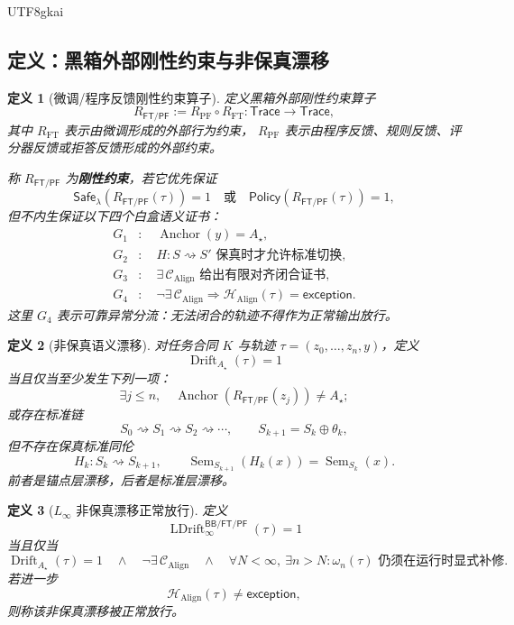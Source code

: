 \documentclass[12pt]{article}
\newtheorem{definition}{定义}[section]
\newcommand{\Linfty}{\ensuremath{L_\infty}}
\newcommand{\Trace}{\mathsf{Trace}}
\newcommand{\Policy}{\mathsf{Policy}}
\newcommand{\Safe}{\mathsf{Safe}}
\newcommand{\Exc}{\mathsf{exception}}
\newcommand{\FTPF}{\mathsf{FT/PF}}
\newcommand{\BB}{\mathsf{BB}}
\newcommand{\Sem}{\operatorname{Sem}}
\newcommand{\Align}{\operatorname{Align}}
\newcommand{\Anchor}{\operatorname{Anchor}}
\newcommand{\Drift}{\operatorname{Drift}}
\newcommand{\LDrift}{\operatorname{LDrift}}
\begin{document}
\begin{CJK*}{UTF8}{gkai}
\subsection{定义：黑箱外部刚性约束与非保真漂移}
\label{subsec:tex51-bb-ftpf-definitions}

\begin{definition}[微调/程序反馈刚性约束算子]
定义黑箱外部刚性约束算子
\[
  R_{\FTPF}
  :=
  R_{\mathrm{PF}}\circ R_{\mathrm{FT}}
  :
  \Trace\to\Trace,
\]
其中 \(R_{\mathrm{FT}}\) 表示由微调形成的外部行为约束，
\(R_{\mathrm{PF}}\) 表示由程序反馈、规则反馈、评分器反馈或拒答反馈形成的外部约束。

称 \(R_{\FTPF}\) 为\textbf{刚性约束}，若它优先保证
\[
  \Safe_\lambda(R_{\FTPF}(\tau))=1
  \quad\text{或}\quad
  \Policy(R_{\FTPF}(\tau))=1,
\]
但不内生保证以下四个白盒语义证书：
\[
\begin{aligned}
  G_1&:\quad \Anchor(y)=A_\star,\\
  G_2&:\quad H:S\rightsquigarrow S'\text{ 保真时才允许标准切换},\\
  G_3&:\quad \exists\,\mathcal C_{\Align}\text{ 给出有限对齐闭合证书},\\
  G_4&:\quad \neg\exists\,\mathcal C_{\Align}\Rightarrow
  \mathcal H_{\Align}(\tau)=\Exc.
\end{aligned}
\]
这里 \(G_4\) 表示可靠异常分流：无法闭合的轨迹不得作为正常输出放行。
\end{definition}

\begin{definition}[非保真语义漂移]
对任务合同 \(K\) 与轨迹 \(\tau=(z_0,\dots,z_n,y)\)，定义
\[
  \Drift_{A_\star}(\tau)=1
\]
当且仅当至少发生下列一项：
\[
  \exists j\le n,\quad
  \Anchor(R_{\FTPF}(z_j))\ne A_\star;
\]
或存在标准链
\[
  S_0\rightsquigarrow S_1\rightsquigarrow S_2\rightsquigarrow\cdots,
  \qquad
  S_{k+1}=S_k\oplus\theta_k,
\]
但不存在保真标准同伦
\[
  H_k:S_k\rightsquigarrow S_{k+1},
  \qquad
  \Sem_{S_{k+1}}(H_k(x))=\Sem_{S_k}(x).
\]
前者是锚点层漂移，后者是标准层漂移。
\end{definition}

\begin{definition}[\texorpdfstring{\(\Linfty\)}{L-infinity} 非保真漂移正常放行]
定义
\[
  \LDrift_{\infty}^{\BB/\FTPF}(\tau)=1
\]
当且仅当
\[
  \Drift_{A_\star}(\tau)=1
  \quad\wedge\quad
  \neg\exists\,\mathcal C_{\Align}
  \quad\wedge\quad
  \forall N<\infty,\ \exists n>N:
  \omega_n(\tau)\text{ 仍须在运行时显式补修}.
\]
若进一步
\[
  \mathcal H_{\Align}(\tau)\ne\Exc,
\]
则称该非保真漂移被正常放行。
\end{definition}


\end{CJK*}
\end{document}
